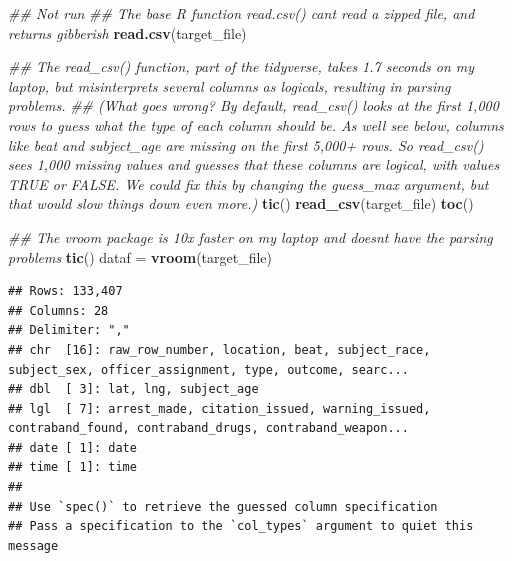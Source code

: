 \documentclass[
]{article}
\newenvironment{Shaded}{\begin{snugshade}}{\end{snugshade}}
\newcommand{\CommentTok}[1]{\textcolor[rgb]{0.56,0.35,0.01}{\textit{#1}}}
\newcommand{\KeywordTok}[1]{\textcolor[rgb]{0.13,0.29,0.53}{\textbf{#1}}}
\newcommand{\NormalTok}[1]{#1}
\newcommand{\StringTok}[1]{\textcolor[rgb]{0.31,0.60,0.02}{#1}}
\begin{document}
\begin{Shaded}
\begin{Highlighting}[]
\CommentTok{\#\# Not run}
\CommentTok{\#\# The base R function \textasciigrave{}read.csv()\textasciigrave{} can\textquotesingle{}t read a zipped file, and returns gibberish}
\KeywordTok{read.csv}\NormalTok{(target\_file)}

\CommentTok{\#\# The \textasciigrave{}read\_csv()\textasciigrave{} function, part of the tidyverse, takes 1.7 seconds on my laptop, but misinterprets several columns as logicals, resulting in parsing problems.}
\CommentTok{\#\# (What goes wrong?  By default, \textasciigrave{}read\_csv()\textasciigrave{} looks at the first 1,000 rows to guess what the type of each column should be.  As we\textquotesingle{}ll see below, columns like \textasciigrave{}beat\textasciigrave{} and \textasciigrave{}subject\_age\textasciigrave{} are missing on the first 5,000+ rows.  So \textasciigrave{}read\_csv()\textasciigrave{} sees 1,000 missing values and guesses that these columns are \textasciigrave{}logical\textasciigrave{}, with values \textasciigrave{}TRUE\textasciigrave{} or \textasciigrave{}FALSE\textasciigrave{}.  We could fix this by changing the \textasciigrave{}guess\_max\textasciigrave{} argument, but that would slow things down even more.)}
\KeywordTok{tic}\NormalTok{()}
\KeywordTok{read\_csv}\NormalTok{(target\_file)}
\KeywordTok{toc}\NormalTok{()}
\end{Highlighting}
\end{Shaded}

\begin{Shaded}
\begin{Highlighting}[]
\CommentTok{\#\# The vroom package is 10x faster on my laptop and doesn\textquotesingle{}t have the parsing problems}
\KeywordTok{tic}\NormalTok{()}
\NormalTok{dataf =}\StringTok{ }\KeywordTok{vroom}\NormalTok{(target\_file)}
\end{Highlighting}
\end{Shaded}

\begin{verbatim}
## Rows: 133,407
## Columns: 28
## Delimiter: ","
## chr  [16]: raw_row_number, location, beat, subject_race, subject_sex, officer_assignment, type, outcome, searc...
## dbl  [ 3]: lat, lng, subject_age
## lgl  [ 7]: arrest_made, citation_issued, warning_issued, contraband_found, contraband_drugs, contraband_weapon...
## date [ 1]: date
## time [ 1]: time
## 
## Use `spec()` to retrieve the guessed column specification
## Pass a specification to the `col_types` argument to quiet this message
\end{verbatim}
\end{document}
